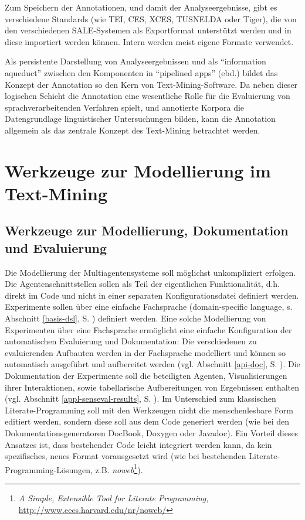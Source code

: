 \documentclass[abstracton, 12pt]{scrartcl}
\begin{document}
Zum Speichern der Annotationen, und damit der Analyseergebnisse, gibt es verschiedene Standards (wie TEI, CES, XCES, TUSNELDA oder Tiger), die von den verschiedenen SALE-Systemen als Exportformat unterstützt werden und in diese importiert werden können. Intern werden meist eigene Formate verwendet. 

Als persistente Darstellung von Analyseergebnissen und als ``information aqueduct'' \citep{BirdEtAl2000} zwischen den Komponenten in ``pipelined apps'' (ebd.) bildet das Konzept der Annotation so den Kern von Text-Mining-Software. Da neben dieser logischen Schicht die Annotation eine wesentliche Rolle für die Evaluierung von sprachverarbeitenden Verfahren spielt, und annotierte Korpora die Datengrundlage linguistischer Untersuchungen bilden, kann die Annotation allgemein als das zentrale Konzept des Text-Mining betrachtet werden.

\section{Werkzeuge zur Modellierung im Text-Mining} \label{chapter-tools}

\subsection{Werkzeuge zur Modellierung, Dokumentation und Evaluierung} \label{ziele-tools}

Die Modellierung der Multiagentensysteme soll möglichst unkompliziert erfolgen. Die Agentenschnittstellen sollen als Teil der eigentlichen Funktionalität, d.h. direkt im Code und nicht in einer separaten Konfigurationsdatei definiert werden. Experimente sollen über eine einfache Fachsprache (domain-specific language, s. Abschnitt \ref{basis-dsl}, S. \pageref{basis-dsl}) definiert werden. Eine solche Modellierung von Experimenten über eine Fachsprache ermöglicht eine einfache Konfiguration der automatischen Evaluierung und Dokumentation: Die verschiedenen zu evaluierenden Aufbauten werden in der Fachsprache modelliert und können so automatisch ausgeführt und aufbereitet werden (vgl. Abschnitt \ref{api-doc}, S. \pageref{api-doc}). Die Dokumentation der Experimente soll die beteiligten Agenten, Visualisierungen ihrer Interaktionen, sowie tabellarische Aufbereitungen von Ergebnissen enthalten (vgl. Abschnitt \ref{appl-senseval-results}, S. \pageref{appl-senseval-results}). Im Unterschied zum klassischen Literate-Programming soll mit den Werkzeugen nicht die menschenlesbare Form editiert werden, sondern diese soll aus dem Code generiert werden (wie bei den Dokumentationsgeneratoren DocBook, Doxygen oder Javadoc). Ein Vorteil dieses Ansatzes ist, dass bestehender Code leicht integriert werden kann, da kein spezifisches, neues Format vorausgesetzt wird (wie bei bestehenden Literate-Programming-Lösungen, z.B. \emph{noweb}\footnote{\emph{A Simple, Extensible Tool for Literate Programming}, \url{http://www.eecs.harvard.edu/nr/noweb/}}).
\end{document}
